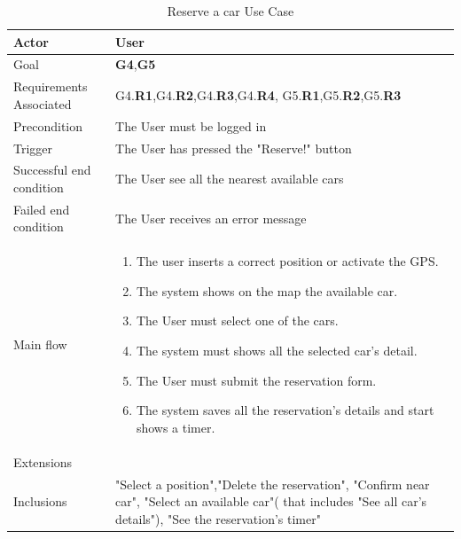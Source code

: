 \newline
\begin{table}[htb]
\begin{center}
\renewcommand{\arraystretch}{1.5}
\begin{tabular}{|l|p{}|}
\hline
Actor & User \\ \hline
Goal & \textbf{G4},\textbf{G5} \\ \hline
Requirements Associated & G4.\textbf{R1},G4.\textbf{R2},G4.\textbf{R3},G4.\textbf{R4}, G5.\textbf{R1},G5.\textbf{R2},G5.\textbf{R3} \\ \hline
Precondition & The User must be logged in \\ \hline
Trigger & The User has pressed the "Reserve!" button \\ \hline
Successful end condition & The User see all the nearest available cars \\ \hline
Failed end condition & The User receives an error message \\ \hline
Main flow & \begin{minipage}[t]{0.6\textwidth}
\begin{enumerate}
\addtolength{\itemindent}{0.5cm}
\item The user inserts a correct position or activate the GPS.
\item The system shows on the map the available car.
\item The User must select one of the cars.
\item The system must shows all the selected car's detail.
\item The User must submit the reservation form.
\item The system saves all the reservation's details and start shows a timer. 
\vspace{2,5mm}
\end{enumerate}
\end{minipage} \\ \hline
Extensions & \\ \hline
Inclusions & "Select a position","Delete the reservation", "Confirm near car", "Select an available car"( that includes "See all car's details"), "See the reservation's timer" \\ \hline
\end{tabular}
\caption{Reserve a car Use Case}
\end{center}
\end{table}
\clearpage

